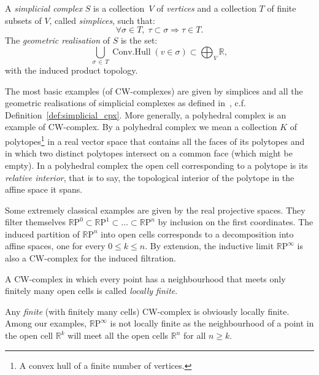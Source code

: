 \documentclass[AHL,Unicode,longabstracts,published]{cedram}
\newcommand{\R}{\mathbb{R}}
\renewcommand{\P}{\mathrm{P}}
\DeclareMathOperator{\convhull}{Conv.Hull}
\let\oldforall\forall
\renewcommand*{\forall}{\mathrel{\oldforall}}
\begin{document}
\begin{defi}\label{def:simplicial_cpx}
A \emph{simplicial complex} $S$ is a collection~$V$ of \emph{vertices} and a collection $T$ of finite subsets of $V$, called \emph{simplices}, such that:
\begin{equation*}
\forall \sigma\in T,\; \tau\subset\sigma \Rightarrow \tau\in T.
\end{equation*}
The \emph{geometric realisation} of $S$ is the set:
\begin{equation*}
\bigcup_{\sigma\,\in\,T} \convhull(v\in\sigma) \subset \bigoplus_V\R,
\end{equation*}
with the induced product topology.
\end{defi}

\begin{exam}
The most basic examples (of CW-complexes) are given by simplices and all the geometric realisations of simplicial complexes as defined in~\cite{Whi_sim_spa}, c.f. Definition~\ref{def:simplicial_cpx}. More generally, a polyhedral complex is an example of CW-complex. By a polyhedral complex we mean a collection $K$ of polytopes\footnote{A convex hull of a finite number of vertices.} in a real vector space that contains all the faces of its polytopes and in which two distinct polytopes intersect on a common face (which might be empty). In a polyhedral complex the open cell corresponding to a polytope is its \emph{relative interior}, that is to say, the topological interior of the polytope in the affine space it spans.
\end{exam}
\begin{exam}
Some extremely classical examples are given by the real projective spaces. They filter themselves ${\R \P^0\subset\R \P^1\subset\dots \subset \R \P^n}$ by inclusion on the first coordinates. The induced partition of $\R \P^n$ into open cells corresponds to a decomposition into affine spaces, one for every $0\leq k\leq n$. By extension, the inductive limit $\R \P^\infty$ is also a CW-complex for the induced filtration.
\end{exam}

\begin{defi}
A CW-complex in which every point has a neighbourhood that meets only finitely many open cells is called \emph{locally finite}.
\end{defi}

Any \emph{finite} (with finitely many cells) CW-complex is obviously locally finite. Among our examples, $\R \P^\infty$ is not locally finite as the neighbourhood of a point in the open cell $\R^k$ will meet all the open cells $\R^n$ for all $n\geq k$.
\end{document}

